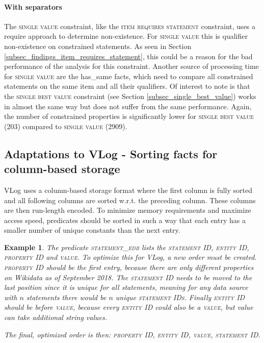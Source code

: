 \documentclass[hyperref,bachelorofscience,fleqn]{cgvpub}
\newtheorem{example}{Example}
\begin{document}
\paragraph{With separators}
The \textsc{single value} constraint, like the \textsc{item requires statement} constraint, uses a require approach to determine non-existence. For \textsc{single value} this is qualifier non-existence on constrained statements. As seen in Section \ref{subsec_findings_item_requires_statement}, this could be a reason for the bad performance of the analysis for this constraint. Another source of processing time for \textsc{single value} are the has\_same facts, which need to compare all constrained statements on the same item and all their qualifiers. Of interest to note is that the \textsc{single best value} constraint (see Section \ref{subsec_single_best_value}) works in almost the same way but does not suffer from the same performance. Again, the number of constrained properties is significantly lower for \textsc{single best value} (203) compared to \textsc{single value} (2909).

\subsection{Adaptations to VLog - Sorting facts for column-based storage}
VLog uses a column-based storage format where the first column is fully sorted and all following columns are sorted w.r.t. the preceding column. These columns are then run-length encoded. To minimize memory requirements and maximize access speed, predicates should be sorted in such a way that each entry has a smaller number of unique constants than the next entry.

\begin{example}
The predicate \textsc{statement\_edb} lists the \textsc{statement ID}, \textsc{entity ID}, \textsc{property ID} and \textsc{value}. To optimize this for VLog, a new order must be created. \textsc{property ID} should be the first entry, because there are only  different properties on Wikidata as of September 2018. The \textsc{statement ID} needs to be moved to the last position since it is unique for all statements, meaning for any data source with \(n\) statements there would be \(n\) unique \textsc{statement IDs}. Finally \textsc{entity ID} should be before \textsc{value}, because every \textsc{entity ID} could also be a \textsc{value}, but value can take additional string values.

The final, optimized order is then: \textsc{property ID}, \textsc{entity ID}, \textsc{value}, \textsc{statement ID}.
\end{example}
\end{document}

